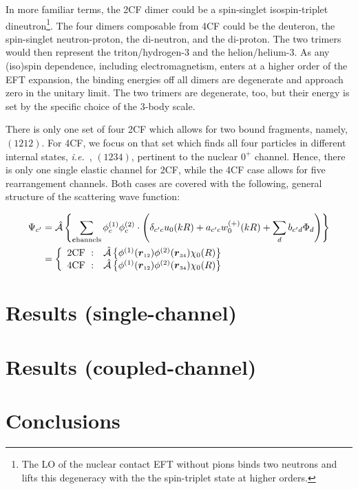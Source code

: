 \documentclass[aps,twocolumn,preprintnumbers,amsmath,amssymb,nofootinbib,superscriptaddress,notitlepage]{revtex4-1}
\newcommand{\ie}{\textit{i.e.}~}
\newcommand{\vsp}[1]{\ensuremath{\boldsymbol{r}}_\text{\tiny #1}}
\newcommand{\la}{\label}
\begin{document}
In more familiar terms, the 2CF dimer could be a spin-singlet isospin-triplet dineutron\footnote{The LO of the nuclear contact EFT without pions
binds two neutrons and lifts this degeneracy with the the spin-triplet state at higher orders.}. The four dimers composable from
4CF could be the deuteron, the spin-singlet neutron-proton, the di-neutron, and the di-proton. The two trimers would then
represent the triton/hydrogen-3 and the helion/helium-3. As any (iso)spin dependence, including electromagnetism,
enters at a higher order of the EFT expansion,
the binding energies off all dimers are degenerate and approach zero in the unitary limit. 
The two trimers are degenerate, too, but their energy is set by the specific choice of the 3-body scale.

There is only one set of four 2CF which allows for two bound fragments, namely, $(1212)$. For 4CF, we focus on that set which
finds all four particles in different internal states, \ie, $(1234)$, pertinent to the nuclear $0^+$ channel.
Hence, there is only one single elastic channel for 2CF, while the 4CF case allows for five rearrangement channels.
Both cases are covered with the following, general structure of the scattering wave function:

\begin{widetext}
\begin{eqnarray*}\la{eq.scatt}
\Psi_{c'}
&=
\hat{\mathcal{A}}
\left\lbrace
\sum_{\text{{\bf c}hannels}}
\phi^{(1)}_c\phi^{(2)}_c
\cdot
\left(
\delta_{c'c}u_0(kR)
+
a_{c'c}w_0^{(+)}(kR)
+
\sum_db_{c'd}\Phi_d
\right)
\right\rbrace
\\
&=
\left\lbrace
\begin{array}{ll}
\text{2CF}~:&\hat{\mathcal{A}}\left\lbrace\phi^{(1)}(\vsp{12})\phi^{(2)}(\vsp{34})\chi_0(R)\right\rbrace\\
\text{4CF}~:&\hat{\mathcal{A}}\left\lbrace\phi^{(1)}(\vsp{12})\phi^{(2)}(\vsp{34})\chi_0(R)\right\rbrace\\
\end{array}
\right.
\end{eqnarray*}
\end{widetext}


\section{Results (single-channel)}

\section{Results (coupled-channel)}

\section{Conclusions}



\end{document}
